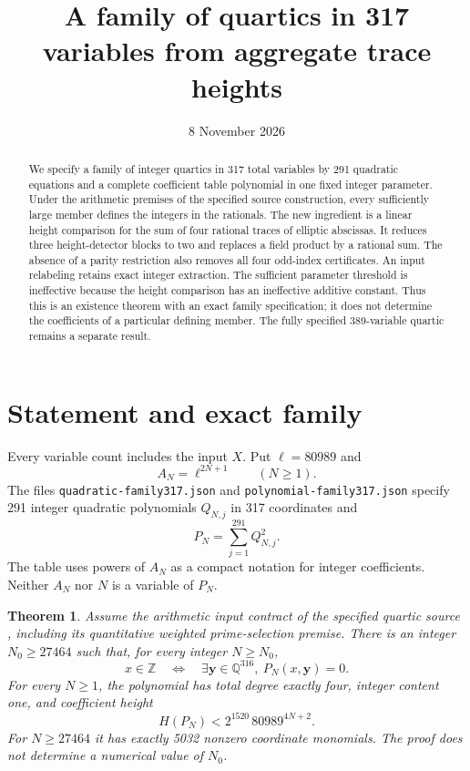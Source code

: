 \documentclass[11pt,a4paper]{article}
\title{A family of quartics in 317 variables from aggregate trace heights}
\author{}\date{8 November 2026}
\newtheorem{theorem}{Theorem}[section]
\theoremstyle{remark}\newtheorem{remark}[theorem]{Remark}
\newcommand{\Q}{\mathbb Q}\newcommand{\Z}{\mathbb Z}
\begin{document}
\maketitle
\begin{abstract}
We specify a family of integer quartics in 317 total variables by
291 quadratic equations and a complete coefficient table polynomial
in one fixed integer parameter. Under the arithmetic premises of
the specified source construction, every sufficiently large member
defines the integers in the rationals. The new ingredient is a
linear height comparison for the sum of four rational traces of
elliptic abscissas. It reduces three height-detector blocks to two
and replaces a field product by a rational sum. The absence of a parity restriction also removes all four odd-index certificates. An input relabeling retains exact integer extraction. The sufficient
parameter threshold is ineffective because the height comparison
has an ineffective additive constant. Thus this is an existence
theorem with an exact family specification; it does not determine
the coefficients of a particular defining member. The fully
specified 389-variable quartic remains a separate result.
\end{abstract}

\section{Statement and exact family}
Every variable count includes the input $X$. Put $\ell=80989$ and
\[
                         A_N=\ell^{2N+1}\qquad(N\ge1).
\]
The files \nolinkurl{quadratic-family317.json} and
\nolinkurl{polynomial-family317.json} specify 291 integer quadratic
polynomials $Q_{N,j}$ in 317 coordinates and
\[
                         P_N=\sum_{j=1}^{291}Q_{N,j}^2.
\]
The table uses powers of $A_N$ as a compact notation for integer
coefficients. Neither $A_N$ nor $N$ is a variable of $P_N$.

\begin{theorem}\label{thm:main}
Assume the arithmetic input contract of the specified quartic source
\cite[Section 2]{Quartic392}, including its quantitative weighted
prime-selection premise. There is an integer $N_0\ge27464$ such that,
for every integer $N\ge N_0$,
\[
 x\in\Z\quad\Longleftrightarrow\quad
 \exists\boldsymbol y\in\Q^{316},\ P_N(x,\boldsymbol y)=0.
\]
For every $N\ge1$, the polynomial has total degree exactly four,
integer content one, and coefficient height
\[
                         H(P_N)<2^{1520}\,80989^{4N+2}.
\]
For $N\ge27464$ it has exactly 5032 nonzero coordinate monomials.
The proof does not determine a numerical value of $N_0$.
\end{theorem}
\end{document}
